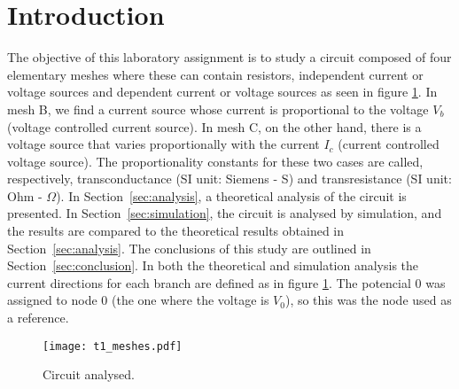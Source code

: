 \section{Introduction}
\label{sec:introduction}

The objective of this laboratory assignment is to study a circuit composed of
four elementary meshes where these can contain resistors, independent current or voltage sources
and dependent current or voltage sources as seen in figure
\ref{fig:rc}.
In mesh B, we find a current source whose current is proportional to the voltage $V_{b}$
(voltage controlled current source).
In mesh C, on the other hand, there is a voltage source that varies proportionally
with the current $I_c$ (current controlled voltage source).
The proportionality constants for these two cases are called, respectively,
transconductance (SI unit: Siemens - S) and transresistance (SI unit: Ohm - $\Omega$).
In Section~\ref{sec:analysis}, a theoretical analysis of the circuit is
presented. In Section~\ref{sec:simulation}, the circuit is analysed by
simulation, and the results are compared to the theoretical results obtained in
Section~\ref{sec:analysis}. The conclusions of this study are outlined in
Section~\ref{sec:conclusion}. In both the theoretical and simulation analysis the current directions for each branch are defined as in figure \ref{fig:rc}. The potencial $0$ was assigned to node $0$ (the one where the voltage is $V_{0}$), so this was the node used as a reference.

\begin{figure}[h] \centering
    \texttt{[image: t1\_meshes.pdf]}
    \caption{Circuit analysed.}
    \label{fig:rc}
\end{figure}


